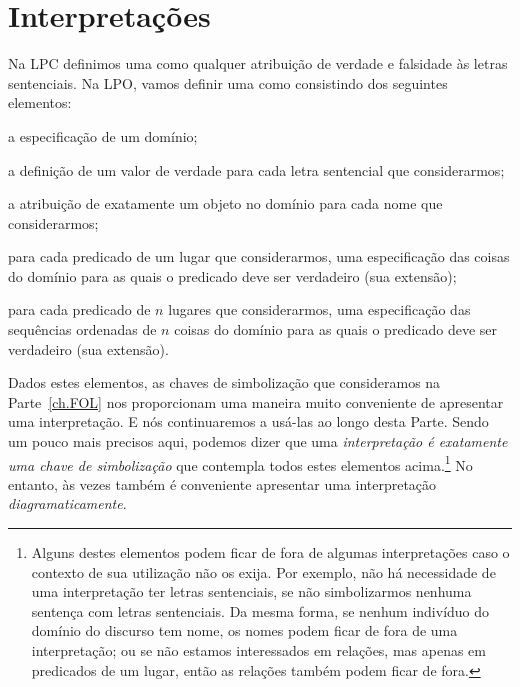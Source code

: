 \section{Interpretações}\label{s:Interpret}
Na LPC definimos uma  como qualquer atribuição de verdade e falsidade às letras sentenciais.
Na LPO, vamos definir uma  como consistindo dos seguintes elementos:
	\begin{ebullet}	
		\item a especificação de um domínio;
		\item a definição de um valor de verdade para cada letra sentencial que considerarmos;
		\item a atribuição de exatamente um objeto no domínio para cada nome que considerarmos;
		\item para cada predicado de um lugar que considerarmos, uma especificação das coisas do domínio para as quais o predicado deve ser verdadeiro (sua extensão);
		\item para cada predicado de $n$ lugares que considerarmos, uma especificação das sequências ordenadas de $n$ coisas do domínio  para as quais o predicado deve ser verdadeiro (sua extensão).
	\end{ebullet}
Dados estes elementos, as chaves de simbolização que consideramos na Parte~\ref{ch.FOL} nos proporcionam uma maneira muito conveniente de apresentar uma interpretação.
E nós continuaremos a usá-las ao longo desta Parte.
Sendo um pouco mais precisos aqui, podemos dizer que uma \emph{interpretação é exatamente uma chave de simbolização} que contempla todos estes elementos acima.\footnote{
	Alguns destes elementos podem ficar de fora de algumas interpretações caso o contexto de sua utilização não os exija. Por exemplo, não há necessidade de uma interpretação ter letras sentenciais, se não simbolizarmos nenhuma sentença com letras sentenciais. Da mesma forma, se nenhum indivíduo do domínio do discurso tem nome, os nomes podem ficar de fora de uma interpretação; ou se não estamos interessados em relações, mas apenas em predicados de um lugar, então as relações também podem ficar de fora.}
No entanto, às vezes também é conveniente apresentar uma interpretação \emph{diagramaticamente}.

